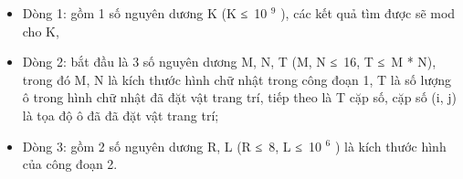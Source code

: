\begin{itemize}
	\item     Dòng 1: gồm 1 số nguyên dương K (K ≤ 10    $^     9    $    ), các kết quả tìm được sẽ mod cho K,   
	\item     Dòng 2: bắt đầu là 3 số nguyên dương M, N, T (M, N ≤ 16, T ≤ M * N), trong đó M, N là kích thước hình chữ nhật trong công đoạn 1, T là số lượng ô trong hình chữ nhật đã đặt vật trang trí, tiếp theo là T cặp số, cặp số (i, j) là tọa độ ô đã đã đặt vật trang trí;   
	\item     Dòng 3: gồm 2 số nguyên dương R, L (R ≤ 8, L ≤ 10    $^     6    $    ) là kích thước hình của công đoạn 2.   
\end{itemize}

\